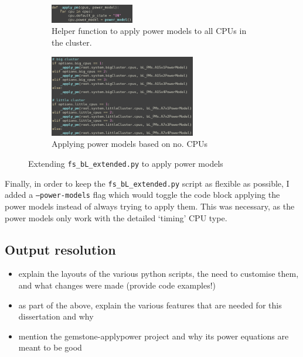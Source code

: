     \begin{figure}[H]
        \centering
        \begin{subfigure}{0.9\linewidth}
            \centering
            \includegraphics[width=0.4\textwidth]{screenshots/config-exts/def-apply-pm.png}
            \caption{Helper function to apply power models to all CPUs in the 
                     cluster.}
        \end{subfigure}
        \begin{subfigure}{0.9\linewidth}
            \centering
            \includegraphics[width=0.7\textwidth]{screenshots/config-exts/apply-power-models.png}
            \caption{Applying power models based on no. CPUs}
        \end{subfigure}
        \caption{Extending \texttt{fs\_bL\_extended.py} to apply power models}
    \end{figure}
    Finally, in order to keep the \texttt{fs\_bL\_extended.py} script as 
    flexible as possible, I added a \texttt{--power-models} flag which would 
    toggle the code block applying the power models instead of always trying to
    apply them. This was necessary, as the power models only work with the 
    detailed `timing' CPU type.
    
    \subsection{Output resolution}



\begin{itemize}
    \item explain the layouts of the various python scripts, the need to
          customise them, and what changes were made (provide code examples!)
    \item as part of the above, explain the various features that are needed for
          this dissertation and why
    \item mention the gemstone-applypower project and why its power equations
          are meant to be good
\end{itemize}
